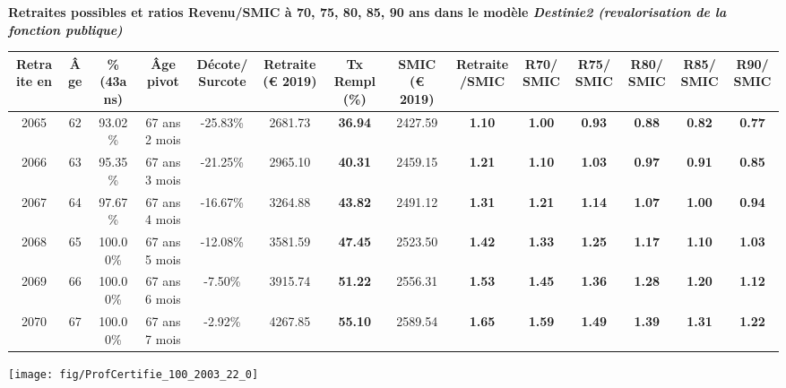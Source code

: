  \vspace{0.1cm} 
{\bf \noindent Retraites possibles et ratios Revenu/SMIC à 70, 75, 80, 85, 90 ans dans le modèle \emph{Destinie2 (revalorisation de la fonction publique)}}  
 
\begin{adjustbox}{max width=\textwidth} 
\begin{tabular}[htb]{|c|c||c|c|c||c|c||c|c||c|c|c|c|c|} 
\hline 
 Retraite en &  Âge &  \%(43ans) &  Âge pivot &  Décote/Surcote &  Retraite (\euro{} 2019) &  Tx Rempl(\%) &  SMIC (\euro{} 2019) &  Retraite/SMIC &  R70/SMIC &  R75/SMIC &  R80/SMIC &  R85/SMIC &  R90/SMIC \\ 
\hline \hline 
 2065 &  62 &  93.02\% &  67 ans 2 mois &  -25.83\% &  2681.73 &  {\bf 36.94} &  2427.59 &  {\bf 1.10} &  {\bf {\color{red} 1.00}} &  {\bf {\color{red} 0.93}} &  {\bf {\color{red} 0.88}} &  {\bf {\color{red} 0.82}} &  {\bf {\color{red} 0.77}} \\ 
\hline 
 2066 &  63 &  95.35\% &  67 ans 3 mois &  -21.25\% &  2965.10 &  {\bf 40.31} &  2459.15 &  {\bf 1.21} &  {\bf 1.10} &  {\bf 1.03} &  {\bf {\color{red} 0.97}} &  {\bf {\color{red} 0.91}} &  {\bf {\color{red} 0.85}} \\ 
\hline 
 2067 &  64 &  97.67\% &  67 ans 4 mois &  -16.67\% &  3264.88 &  {\bf 43.82} &  2491.12 &  {\bf 1.31} &  {\bf 1.21} &  {\bf 1.14} &  {\bf 1.07} &  {\bf {\color{red} 1.00}} &  {\bf {\color{red} 0.94}} \\ 
\hline 
 2068 &  65 &  100.00\% &  67 ans 5 mois &  -12.08\% &  3581.59 &  {\bf 47.45} &  2523.50 &  {\bf 1.42} &  {\bf 1.33} &  {\bf 1.25} &  {\bf 1.17} &  {\bf 1.10} &  {\bf 1.03} \\ 
\hline 
 2069 &  66 &  100.00\% &  67 ans 6 mois &  -7.50\% &  3915.74 &  {\bf 51.22} &  2556.31 &  {\bf 1.53} &  {\bf 1.45} &  {\bf 1.36} &  {\bf 1.28} &  {\bf 1.20} &  {\bf 1.12} \\ 
\hline 
 2070 &  67 &  100.00\% &  67 ans 7 mois &  -2.92\% &  4267.85 &  {\bf 55.10} &  2589.54 &  {\bf 1.65} &  {\bf 1.59} &  {\bf 1.49} &  {\bf 1.39} &  {\bf 1.31} &  {\bf 1.22} \\ 
\hline 
\hline 
\end{tabular} 
\end{adjustbox} 
 
 \vspace{0.1cm} 

 {\hspace{-2.2cm}\texttt{[image: fig/ProfCertifie\_100\_2003\_22\_0]}} 

